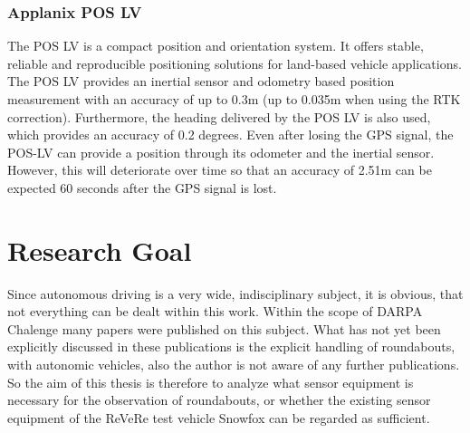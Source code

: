 \subsubsection{Applanix POS LV}
The POS LV is a compact position and orientation system. It offers stable, reliable and reproducible positioning solutions for land-based vehicle applications. The POS LV provides an 
inertial sensor and odometry based position measurement with an accuracy of up to 0.3m (up to 0.035m when using the RTK correction).
Furthermore, the heading delivered by the POS LV is also used, which provides an accuracy of 0.2 degrees. Even after losing the GPS signal,
the POS-LV can provide a position through its odometer and the inertial sensor. However, this will deteriorate over time so that an accuracy of 2.51m
can be expected 60 seconds after the GPS signal is lost. \cite{manAP}


\section{Research Goal}
Since autonomous driving is a very wide, indisciplinary subject, it is obvious, that not everything can be dealt within this work.
Within the scope of \acs{DARPA} Chalenge many papers were published on this subject. What has not yet been explicitly discussed in these publications
is the explicit handling of roundabouts, with autonomic vehicles, also the author is not aware of any further publications. 
So the aim of this thesis is therefore to analyze what sensor equipment is necessary for the observation of roundabouts,
or whether the existing sensor equipment of the ReVeRe test vehicle Snowfox can be regarded as sufficient.

